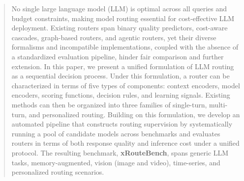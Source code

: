 \begin{abstract}
No single large language model (LLM) is optimal across all queries and budget constraints, making model routing essential for cost-effective LLM deployment.
Existing routers span binary quality predictors, cost-aware cascades, graph-based routers, and agentic routers, yet their diverse formalisms and incompatible implementations, coupled with the absence of a standardized evaluation pipeline, hinder fair comparison and further extension.
In this paper, we present a unified formulation of LLM routing as a sequential decision process. Under this formulation, a router can be characterized in terms of five types of components: context encoders, model encoders, scoring functions, decision rules, and learning signals. Existing methods can then be organized into three families of single-turn, multi-turn, and personalized routing.
Building on this formulation, we develop an automated pipeline that constructs routing supervision by systematically running a pool of candidate models across benchmarks and evaluates routers in terms of both response quality and inference cost under a unified protocol. The resulting benchmark, \textbf{xRouteBench}, spans generic LLM tasks, memory-augmented, vision (image and video), time-series, and personalized routing scenarios.

\end{abstract}
